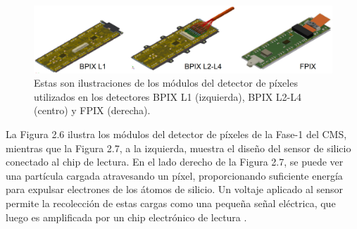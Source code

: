 \begin{center}
  \begin{figure}[h]
    \centering
    \includegraphics[scale=.2]{Chapter2/modules_drawing.png}
    \caption[Tipos de módulos en el detector de pixeles]{Estas son ilustraciones de los módulos del detector de píxeles utilizados en los detectores BPIX L1 (izquierda), BPIX L2-L4 (centro) y FPIX (derecha).}
    \label{modules_drawing}
  \end{figure}
\end{center}

La Figura 2.6 ilustra los módulos del detector de píxeles de la Fase-1 del CMS, mientras que la Figura 2.7, a la izquierda, muestra el diseño del sensor de silicio conectado al chip de lectura. En el lado derecho de la Figura 2.7, se puede ver una partícula cargada atravesando un píxel, proporcionando suficiente energía para expulsar electrones de los átomos de silicio. Un voltaje aplicado al sensor permite la recolección de estas cargas como una pequeña señal eléctrica, que luego es amplificada por un chip electrónico de lectura \cite{phase1_Pixel_Detector}.\\

